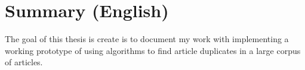 \chapter{Summary (English)}

The goal of this thesis is create is to document my work with implementing a working prototype of using algorithms to find article duplicates in a large corpus of articles.